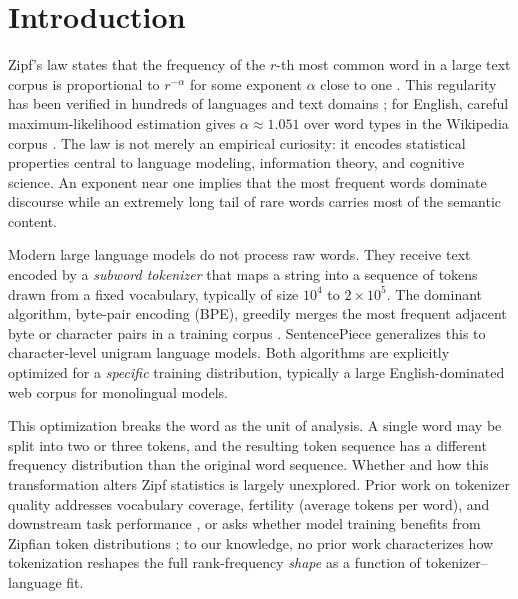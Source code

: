 \documentclass{article}
\begin{document}

\section{Introduction}
\label{sec:intro}

Zipf's law states that the frequency of the $r$-th most common word in a large text
corpus is proportional to $r^{-\alpha}$ for some exponent $\alpha$ close to one
\citep{zipf1949}. This regularity has been verified in hundreds of languages and
text domains \citep{piantadosi2014}; for English, careful maximum-likelihood estimation
gives $\alpha \approx 1.051$ over word types in the Wikipedia corpus \citep{piantadosi2014}.
The law is not merely an empirical curiosity: it encodes statistical properties
central to language modeling, information theory, and cognitive science. An exponent
near one implies that the most frequent words dominate discourse while an extremely
long tail of rare words carries most of the semantic content.

Modern large language models do not process raw words. They receive text encoded by a
\emph{subword tokenizer} that maps a string into a sequence of tokens drawn from a
fixed vocabulary, typically of size $10^4$ to $2 \times 10^5$. The dominant algorithm,
byte-pair encoding (BPE), greedily merges the most frequent adjacent byte or character
pairs in a training corpus \citep{sennrich2016}. SentencePiece \citep{kudo2018}
generalizes this to character-level unigram language models. Both algorithms are
explicitly optimized for a \emph{specific} training distribution, typically a large
English-dominated web corpus for monolingual models.

This optimization breaks the word as the unit of analysis. A single word may be split
into two or three tokens, and the resulting token sequence has a different frequency
distribution than the original word sequence. Whether and how this transformation alters
Zipf statistics is largely unexplored. Prior work on tokenizer quality addresses
vocabulary coverage, fertility (average tokens per word), and downstream task
performance \citep{petrov2023tokenization}, or asks whether model training benefits from
Zipfian token distributions \citep{he2025pretrained}; to our knowledge, no prior work
characterizes how tokenization reshapes the full rank-frequency \emph{shape} as a
function of tokenizer--language fit.
\end{document}
